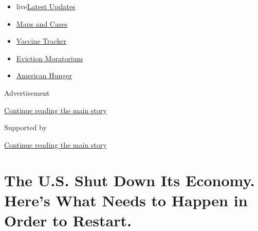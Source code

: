 \begin{itemize}
\tightlist
\item
  live\href{https://www.nytimes3xbfgragh.onion/2020/09/08/world/covid-19-coronavirus.html?name=styln-coronavirus-national\&region=TOP_BANNER\&block=storyline_menu_recirc\&action=click\&pgtype=Article\&impression_id=59f68270-f27e-11ea-879c-3d80aa080e10\&variant=undefined}{Latest
  Updates}
\item
  \href{https://www.nytimes3xbfgragh.onion/interactive/2020/us/coronavirus-us-cases.html?name=styln-coronavirus-national\&region=TOP_BANNER\&block=storyline_menu_recirc\&action=click\&pgtype=Article\&impression_id=59f68271-f27e-11ea-879c-3d80aa080e10\&variant=undefined}{Maps
  and Cases}
\item
  \href{https://www.nytimes3xbfgragh.onion/interactive/2020/science/coronavirus-vaccine-tracker.html?name=styln-coronavirus-national\&region=TOP_BANNER\&block=storyline_menu_recirc\&action=click\&pgtype=Article\&impression_id=59f68272-f27e-11ea-879c-3d80aa080e10\&variant=undefined}{Vaccine
  Tracker}
\item
  \href{https://www.nytimes3xbfgragh.onion/2020/09/02/your-money/eviction-moratorium-covid.html?name=styln-coronavirus-national\&region=TOP_BANNER\&block=storyline_menu_recirc\&action=click\&pgtype=Article\&impression_id=59f68273-f27e-11ea-879c-3d80aa080e10\&variant=undefined}{Eviction
  Moratorium}
\item
  \href{https://www.nytimes3xbfgragh.onion/interactive/2020/09/02/magazine/food-insecurity-hunger-us.html?name=styln-coronavirus-national\&region=TOP_BANNER\&block=storyline_menu_recirc\&action=click\&pgtype=Article\&impression_id=59f6a980-f27e-11ea-879c-3d80aa080e10\&variant=undefined}{American
  Hunger}
\end{itemize}

Advertisement

\protect\hyperlink{after-top}{Continue reading the main story}

Supported by

\protect\hyperlink{after-sponsor}{Continue reading the main story}

\hypertarget{the-us-shut-down-its-economy-heres-what-needs-to-happen-in-order-to-restart}{%
\section{The U.S. Shut Down Its Economy. Here's What Needs to Happen in
Order to
Restart.}\label{the-us-shut-down-its-economy-heres-what-needs-to-happen-in-order-to-restart}}


